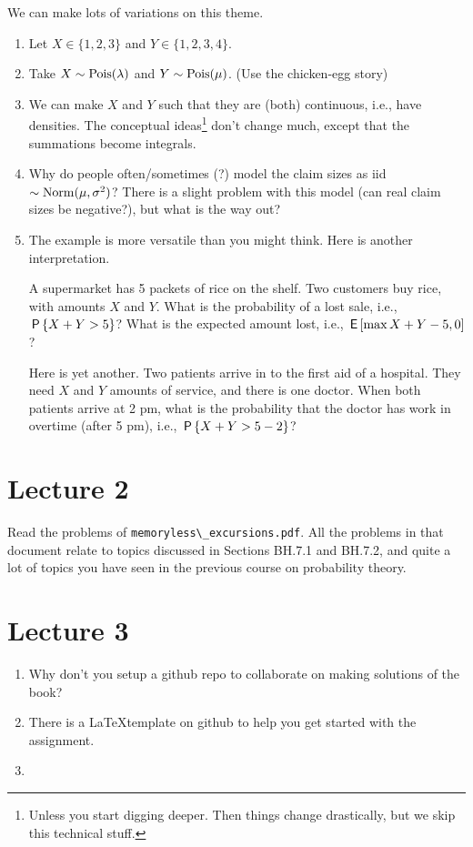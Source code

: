 \begin{remark}
We can  make lots of variations on this theme.
\begin{enumerate}
\item Let $X\in \{1,2,3\}$ and $Y\in \{1,2,3,4\}$.
\item Take $X\sim\Pois{\lambda}$ and $Y\sim\Pois{\mu}$. (Use the chicken-egg story)
\item We can make $X$ and $Y$ such that they are (both) continuous, i.e., have densities.
  The conceptual ideas\footnote{Unless you start digging deeper.
    Then things change drastically, but we skip this technical stuff.}
  don't change much, except that the summations become integrals.
\item Why do people often/sometimes (?)
  model the claim sizes as iid $\sim\Norm{\mu, \sigma^{2}}$?
  There is a slight problem with this model (can real claim sizes be negative?), but what is the way out?
\item The example is more versatile than you might think. Here is another interpretation.

A supermarket has 5 packets of rice on the shelf.
Two customers buy rice, with amounts $X$ and $Y$.
What is the probability of a lost sale, i.e., $\P{X+Y>5}$?
What is the expected amount lost, i.e., $\E{ \max{X+Y - 5,0}}$?

Here is yet another.
Two patients arrive in to the first aid of a hospital.
They need $X$ and $Y$ amounts of service, and there is one doctor.
When both patients arrive at 2 pm, what is the probability that the doctor has work in overtime (after 5 pm), i.e., $\P{X+Y > 5- 2}$?
\end{enumerate}
\end{remark}


\section{Lecture 2}

Read the problems of \verb|memoryless\_excursions.pdf|.
All the problems in that document relate to topics discussed in Sections BH.7.1 and BH.7.2, and quite a lot of topics you have seen in the previous course on probability theory.


\section{Lecture 3}

\begin{enumerate}
\item Why don't you setup a github repo to collaborate on making  solutions of the book?
\item There is a \LaTeX template on github to help you get started with the assignment.
\item
\end{enumerate}

